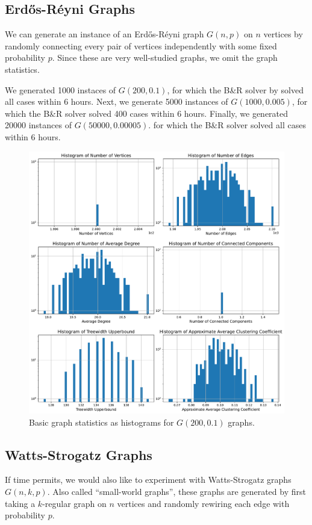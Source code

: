 \documentclass{article}
\begin{document}
\subsection{Erd\H os-R\'eyni Graphs}
We can generate an instance of an Erd\H os-R\'eyni graph $G(n, p)$ on $n$ vertices
by randomly connecting every pair of vertices independently
with some fixed probability $p$.
Since these are very well-studied graphs,
we omit the graph statistics.

We generated 1000 instaces of $G(200, 0.1)$,
for which the B\&R solver by \citet{kamis} solved all cases within 6 hours.
Next, we generate 5000 instances of $G(1000, 0.005)$,
for which the B\&R solver solved 400 cases within 6 hours.
Finally, we generated 20000 instances of $G(50000, 0.00005)$.
for which the B\&R solver solved all cases within 6 hours.

\begin{figure}
     \centering
     \includegraphics[width=\textwidth]{figures/erdos_reyni_small}
     \caption{Basic graph statistics as histograms for $G(200, 0.1)$ graphs.}
     \label{fig:erdos_reyni_small}
\end{figure}

\subsection{Watts-Strogatz Graphs}
If time permits, we would also like to experiment with Watts-Strogatz graphs $G(n, k, p)$.
Also called ``small-world graphs'',
these graphs are generated by first taking a $k$-regular graph on $n$ vertices
and randomly rewiring each edge with probability $p$.
\end{document}
